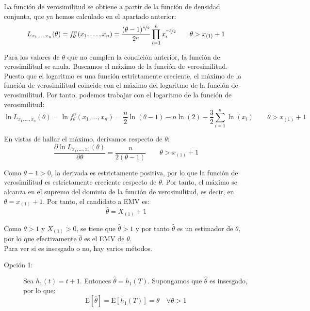 \documentclass[12pt]{article}
\newcommand{\E}{\mathrm{E}}
\begin{document}
\begin{ejercicio}[2.5 puntos]
\begin{enumerate}[label=\alph*)]
            La función de verosimilitud se obtiene a partir de la función de densidad conjunta, que ya hemos calculado en el apartado anterior:
            \begin{equation*}
                L_{x_1, \ldots, x_n}(\theta) = f_\theta^n(x_1, \ldots, x_n) = \dfrac{(\theta-1)^{\nicefrac{n}{2}}}{2^n} \prod_{i=1}^{n} x_i^{\nicefrac{-3}{2}}\qquad \theta > x_{(1)} + 1
            \end{equation*}

            Para los valores de $\theta$ que no cumplen la condición anterior, la función de verosimilitud se anula. Buscamos el máximo de la función de verosimilitud. Puesto que el logaritmo es una función estrictamente creciente, el máximo de la función de verosimilitud coincide con el máximo del logaritmo de la función de verosimilitud. Por tanto, podemos trabajar con el logaritmo de la función de verosimilitud:
            \begin{equation*}
                \ln L_{x_1, \ldots, x_n}(\theta) = \ln f_\theta^n(x_1, \ldots, x_n) = \dfrac{n}{2} \ln(\theta-1) - n \ln(2) - \dfrac{3}{2} \sum_{i=1}^{n} \ln(x_i) \qquad \theta > x_{(1)} + 1
            \end{equation*}

            En vistas de hallar el máximo, derivamos respecto de $\theta$:
            \begin{equation*}
                \dfrac{\partial \ln L_{x_1, \ldots, x_n}(\theta)}{\partial \theta} = \dfrac{n}{2 (\theta-1)} \qquad \theta > x_{(1)} + 1
            \end{equation*}

            Como $\theta - 1 > 0$, la derivada es estrictamente positiva, por lo que la función de verosimilitud es estrictamente creciente respecto de $\theta$. Por tanto, el máximo se alcanza en el supremo del dominio de la función de verosimilitud, es decir, en $\theta= x_{(1)} + 1$. Por tanto, el candidato a EMV es:
            \begin{equation*}
                \hat{\theta} = X_{(1)} + 1
            \end{equation*}

            Como $\theta>1$ y $X_{(1)} > 0$, se tiene que $\hat{\theta} > 1$ y por tanto $\hat{\theta}$ es un estimador de $\theta$, por lo que efectivamente $\hat{\theta}$ es el EMV de $\theta$.\\

            Para ver si es insesgado o no, hay varios métodos.
            \begin{description}
                \item[Opción 1:] Sea $h_1(t) = t + 1$. Entonces $\hat{\theta} = h_1(T)$. Supongamos que $\hat{\theta}$ es insesgado, por lo que:
                \begin{equation*}
                    \E[\hat{\theta}] = \E[h_1(T)] = \theta \quad \forall \theta > 1
                \end{equation*}


\end{description}
\end{enumerate}
\end{ejercicio}
\end{document}
